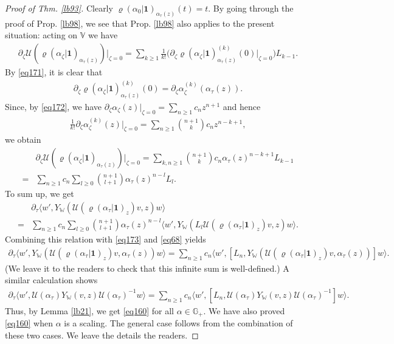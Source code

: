 \documentclass[11pt,b5paper,notitlepage]{article}
\theoremstyle{definition}
\theoremstyle{plain}
\newcommand{\mc}{\mathcal}
\newcommand{\id}{\mathbf{1}}
\newcommand{\bigbk}[1]{\big\langle {#1}\big\rangle}
\newcommand{\Vbb}{\mathbb V}
\newcommand{\Wbb}{\mathbb W}
\newcommand{\Gbb}{\mathbb G}
\numberwithin{equation}{section}
\begin{document}
\begin{proof}[Proof of Thm. \ref{lb93}]
Clearly $\varrho(\alpha_0|\id)_{\alpha_\tau(z)}(t)=t$. By going through the proof of Prop. \ref{lb98}, we see that Prop. \ref{lb98} also applies to the present situation: acting on $\Vbb$ we have
\begin{align}
\partial_\zeta\mc U(\varrho(\alpha_\zeta|\id)_{\alpha_\tau(z)})\Big|_{\zeta=0}=\sum_{k\geq 1}\frac 1{k!}\Big(\partial_\zeta\varrho(\alpha_\zeta|\id)_{\alpha_\tau(z)}^{(k)}(0)\Big|_{\zeta=0} \Big)L_{k-1}.	
\end{align}
By \eqref{eq171}, it is clear that
\begin{align*}
\partial_\zeta\varrho(\alpha_\zeta|\id)_{\alpha_\tau(z)}^{(k)}(0)=\partial_\zeta\alpha_\zeta^{(k)}(\alpha_\tau(z)).	
\end{align*}
Since, by \eqref{eq172}, we have $\partial_\zeta\alpha_\zeta(z)\big|_{\zeta=0}=\sum_{n\ge 1}c_nz^{n+1}$ and hence
\begin{align*}
\frac 1{k!}\partial_\zeta\alpha_\zeta^{(k)}(z)\big|_{\zeta=0}=\sum_{n\geq 1}{n+1\choose k}c_nz^{n-k+1},	
\end{align*}
we obtain
\begin{align}
&\partial_\zeta\mc U(\varrho(\alpha_\zeta|\id)_{\alpha_\tau(z)})\Big|_{\zeta=0}=\sum_{k,n\geq 1}{n+1\choose k}c_n\alpha_\tau(z)^{n-k+1}L_{k-1}\nonumber\\
=&\sum_{n\geq 1}c_n\sum_{l\geq 0}{n+1\choose l+1}\alpha_\tau(z)^{n-l}L_l.
\end{align}
To sum up, we get
\begin{align}
&\partial_\tau\bigbk{w',Y_\Wbb(\mc U(\varrho(\alpha_\tau|\id)_z)v,z)w}\nonumber\\
=&	\sum_{n\geq 1}c_n\sum_{l\geq 0}{n+1\choose l+1}\alpha_\tau(z)^{n-l}\bigbk{w',Y_\Wbb(L_l\mc U(\varrho(\alpha_\tau|\id)_z)v,z)w}.
\end{align}
Combining this relation with \eqref{eq173} and \eqref{eq68} yields
\begin{align}
\partial_\tau\bigbk{w',Y_\Wbb(\mc U(\varrho(\alpha_\tau|\id)_z)v,\alpha_\tau(z))w}=\sum_{n\geq 1}c_n	\bigbk{w',[L_n,Y_\Wbb(\mc U(\varrho(\alpha_\tau|\id)_z)v,\alpha_\tau(z))]w}.
\end{align}
(We leave it to the readers to check that this infinite sum is well-defined.) A similar calculation shows
\begin{align}
\partial_\tau\bigbk{w',\mc U(\alpha_\tau)Y_\Wbb(v,z)\mc U(\alpha_\tau)^{-1}w}=\sum_{n\geq 1}c_n	\bigbk{w',[L_n,\mc U(\alpha_\tau)Y_\Wbb(v,z)\mc U(\alpha_\tau)^{-1}]w}.
\end{align}
Thus, by Lemma \ref{lb21}, we get \eqref{eq160} for all $\alpha\in\Gbb_+$. We have also proved \eqref{eq160} when $\alpha$ is a scaling. The general case follows from the combination of these two cases. We leave the details the readers. 
\end{proof}
\end{document}
